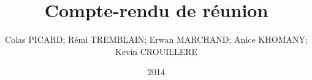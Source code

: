 \documentclass{report}
\title{Compte-rendu de réunion}
\author{Colas \textsc{PICARD}; Rémi \textsc{TREMBLAIN}; Erwan \textsc{MARCHAND}; Anice \textsc{KHOMANY}; Kevin \textsc{CROUILLERE}}
\date{2014}
\makeatletter
\def\thetitle{\@title}
\makeatother
\begin{document}
    
    \begin{center}
        \large\bf{\thetitle}
    \end{center}
\end{document}

